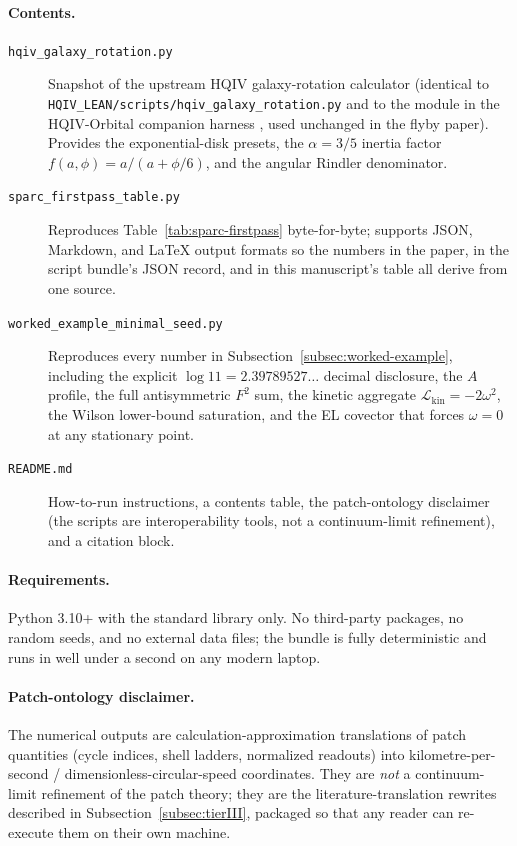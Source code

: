 \documentclass[11pt]{amsart}
\begin{document}
\paragraph{Contents.}
\begingroup
\sloppy
\setlength{\emergencystretch}{4em}
\begin{description}
\item[\texttt{hqiv\_galaxy\_rotation.py}] Snapshot of the upstream HQIV galaxy-rotation calculator (identical to \texttt{HQIV\_LEAN/scripts/hqiv\_galaxy\_rotation.py} and to the module in the HQIV-Orbital companion harness \cite{hqiv-orbital}, used unchanged in the flyby paper). Provides the exponential-disk presets, the \(\alpha=3/5\) inertia factor \(f(a,\phi)=a/(a+\phi/6)\), and the angular Rindler denominator.
\item[\texttt{sparc\_firstpass\_table.py}] Reproduces Table~\ref{tab:sparc-firstpass} byte-for-byte; supports JSON, Markdown, and LaTeX output formats so the numbers in the paper, in the script bundle's JSON record, and in this manuscript's table all derive from one source.
\item[\texttt{worked\_example\_minimal\_seed.py}] Reproduces every number in Subsection~\ref{subsec:worked-example}, including the explicit \(\log 11=2.39789527\ldots\) decimal disclosure, the \(A\) profile, the full antisymmetric \(F^2\) sum, the kinetic aggregate \(\mathcal{L}_{\mathrm{kin}}=-2\omega^2\), the Wilson lower-bound saturation, and the EL covector that forces \(\omega=0\) at any stationary point.
\item[\texttt{README.md}] How-to-run instructions, a contents table, the patch-ontology disclaimer (the scripts are interoperability tools, not a continuum-limit refinement), and a citation block.
\end{description}
\endgroup

\paragraph{Requirements.}
Python 3.10+ with the standard library only. No third-party packages, no random seeds, and no external data files; the bundle is fully deterministic and runs in well under a second on any modern laptop.

\paragraph{Patch-ontology disclaimer.}
The numerical outputs are calculation-approximation translations of patch quantities (cycle indices, shell ladders, normalized readouts) into kilometre-per-second / dimensionless-circular-speed coordinates. They are \emph{not} a continuum-limit refinement of the patch theory; they are the literature-translation rewrites described in Subsection~\ref{subsec:tierIII}, packaged so that any reader can re-execute them on their own machine.
\end{document}
